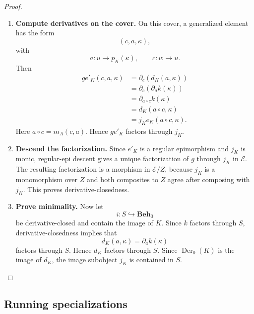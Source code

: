\begin{proof}
\begin{enumerate}
        \item \textbf{Compute derivatives on the cover.} On this cover, a generalized element has the form
        \[
            (c,a,\kappa),
        \]
        with
        \[
            a:u\to p_K(\kappa),
            \qquad
            c:w\to u.
        \]
        Then
        \[
            \begin{aligned}
                g e'_K(c,a,\kappa)
                &=
                \partial_c(d_K(a,\kappa))
                \\
                &=
                \partial_c(\partial_a k(\kappa))
                \\
                &=
                \partial_{a\circ c}k(\kappa)
                \\
                &=
                d_K(a\circ c,\kappa)
                \\
                &=
                j_K e_K(a\circ c,\kappa).
            \end{aligned}
        \]
        Here \(a\circ c=m_A(c,a)\). Hence \(g e'_K\) factors through \(j_K\).

        \item \textbf{Descend the factorization.} Since \(e'_K\) is a regular epimorphism and \(j_K\) is monic, regular-epi descent gives a unique factorization of \(g\) through \(j_K\) in \(\mathcal E\). The resulting factorization is a morphism in \(\mathcal E/Z\), because \(j_K\) is a monomorphism over \(Z\) and both composites to \(Z\) agree after composing with \(j_K\). This proves derivative-closedness.

        \item \textbf{Prove minimality.} Now let
        \[
            i:S\hookrightarrow\mathbf{Beh}_0
        \]
        be derivative-closed and contain the image of \(K\). Since \(k\) factors through \(S\), derivative-closedness implies that
        \[
            d_K(a,\kappa)=\partial_a k(\kappa)
        \]
        factors through \(S\). Hence \(d_K\) factors through \(S\). Since \(\operatorname{Der}_0(K)\) is the image of \(d_K\), the image subobject \(j_K\) is contained in \(S\).
    \end{enumerate}
\end{proof}

\subsection{Running specializations}
\label{subsec:specifications-running-specializations}

